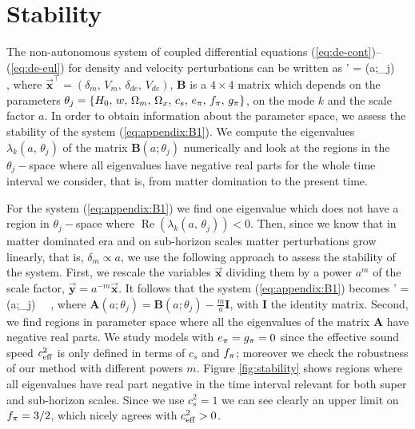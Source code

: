 \chapter{Stability}
\label{appendix1-ade}

The non-autonomous system of coupled differential equations (\ref{eq:de-cont})--(\ref{eq:de-eul}) for density and velocity perturbations can be written as
\be 
{}' = (a;\theta_j) \, \, ,
\label{eq:appendix:B1}
\ee
where $ \vec{\mathbf{x}}^\intercal = (\delta_m,\, V_m,\, \delta_{de},\, V_{de}) $, $ \mathbf{B} $ is a $ 4\times4 $ matrix which depends on the parameters $\theta_j=\lcb H_0,\, w,\, \Omega_m,\, \Omega_x,\,  c_s,\, \aa,\, \ff,\, \gg \rcb$, on the mode $ k $ and the scale factor $ a $. In order to obtain information about the parameter space, we assess the stability of the system (\ref{eq:appendix:B1}). We compute the eigenvalues $ \lambda_k (a,\, \theta_j)$ of the matrix $\mathbf{B}(a;\theta_j)$ numerically and look at the regions in the $\theta_j-$space where all eigenvalues have negative real parts for the whole time interval we consider, that is, from matter domination to the present time. 

For the system (\ref{eq:appendix:B1}) we find one eigenvalue which does not have a region in $\theta_j-$space where $\operatorname{Re} \left( \lambda_k (a,\, \theta_j) \right) < 0$. Then, since we know that in matter dominated era and on sub-horizon scales matter perturbations grow linearly, that is, $ \delta_m \propto a$, we use the following approach to assess the stability of the system. First, we rescale the  variables $ \vec{\mathbf{x}} $ dividing them by a power $ a^m $ of the scale factor, $\vec{\mathbf{y}}=a^{-m}\vec{\mathbf{x}}$. It follows that the system  (\ref{eq:appendix:B1}) becomes   
\be
{}' = (a;\theta_j) \, \, ,
\label{eq:appendix:B2}
\ee
where $ \mathbf{A}(a;\theta_j) = \mathbf{B}(a;\theta_j) - \frac{m}{a} \mathbf{I}  $, with $ \mathbf{I} $ the identity matrix. Second, we find regions in parameter space where all the eigenvalues of the matrix $ \mathbf{A} $ have negative real parts. We study models with $ \aa=\gg=0 $ since the effective sound speed $ \ceff^2 $ is only defined in terms of $ c_s $ and $ \ff $;  moreover we check the robustness of our method with different powers $ m $. Figure \ref{fig:stability} shows regions where all eigenvalues have real part negative in the time interval relevant for both super and sub-horizon scales.  Since we use $ c_s^2=1 $ we can see clearly an upper limit on $ \ff =3/2$, which nicely agrees with $ \ceff^2>0 $.  

